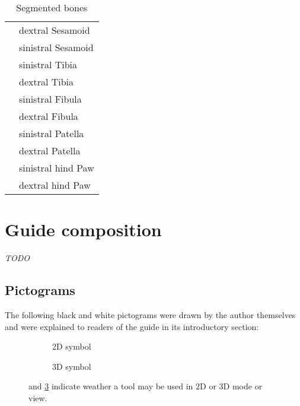 \begin{table}
\begin{center}
\begin{tabular}{l l}
			                  & dextral Sesamoid        \\
			                  & sinistral Sesamoid      \\
			                  & sinistral Tibia         \\
			                  & dextral Tibia           \\
			                  & sinistral Fibula        \\
			                  & dextral Fibula          \\
			                  & sinistral Patella       \\
			                  & dextral Patella         \\
			                  & sinistral hind Paw      \\
			                  & dextral hind Paw        \\
			\hline
		\end{tabular}
		\caption{Segmented bones}\label{tab:bones}
	\end{center}
\end{table}


\section{Guide composition}\label{s:guide_comp}
\textit{TODO}

\subsection{Pictograms}\label{s:mm-pictograms}
The following black and white pictograms were drawn by the author themselves and were explained to readers of the guide in its introductory section:
\newline
\begin{figure}[h!]
	\begin{centering}
		\begin{subfigure}{0.5\textwidth}
			
			\caption{2D symbol}\label{fig:2d_icon}
		\end{subfigure}
		\begin{subfigure}{0.5\textwidth}
			
			\caption{3D symbol}\label{fig:3d_icon}
		\end{subfigure}
	\end{centering}
	\caption{ and \cref{fig:3d_icon} indicate weather a tool may be used in 2D or 3D mode or view.}
\end{figure}

